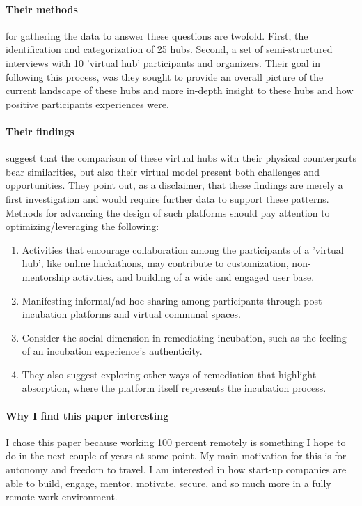 \paragraph{Their methods} for gathering the data to answer these questions are twofold. First, the identification and categorization of 25 hubs. Second, a set of semi-structured interviews with 10 'virtual hub' participants and organizers. Their goal in following this process, was they sought to provide an overall picture of the current landscape of these hubs and more in-depth insight to these hubs and how positive participants experiences were.

\paragraph{Their findings} suggest that the comparison of these virtual hubs with their physical counterparts bear similarities, but also their virtual model present both challenges and opportunities. They point out, as a disclaimer, that these findings are merely a first investigation and would require further data to support these patterns. Methods for advancing the design of such platforms should pay attention to optimizing/leveraging the following:

\begin{enumerate}
\item
  Activities that encourage collaboration among the participants of a 'virtual hub', like online hackathons, may contribute to customization, non-mentorship activities, and building of a wide and engaged user base.
\item
  Manifesting informal/ad-hoc sharing among participants through post-incubation platforms and virtual communal spaces.
\item
  Consider the social dimension in remediating incubation, such as the feeling of an incubation experience's authenticity.
\item
  They also suggest exploring other ways of remediation that highlight absorption, where the platform itself represents the incubation process.
\end{enumerate}

\paragraph{Why I find this paper interesting}
I chose this paper because working 100 percent remotely is something I hope to do in the next couple of years at some point. My main motivation for this is for autonomy and freedom to travel. I am interested in how start-up companies are able to build, engage, mentor, motivate, secure, and so much more in a fully remote work environment.

